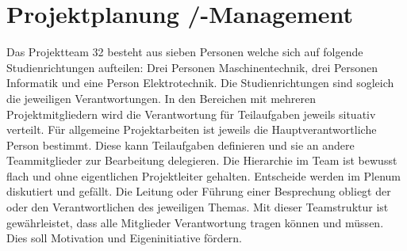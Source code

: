 \section{Projektplanung /-Management}
	Das Projektteam 32 besteht aus sieben Personen welche sich auf folgende Studienrichtungen aufteilen: Drei Personen Maschinentechnik, drei Personen Informatik und eine Person Elektrotechnik. Die Studienrichtungen sind sogleich die jeweiligen Verantwortungen. In den Bereichen mit mehreren Projektmitgliedern wird die Verantwortung  für Teilaufgaben jeweils situativ verteilt. Für allgemeine Projektarbeiten ist jeweils die Hauptverantwortliche Person bestimmt. Diese kann Teilaufgaben definieren und sie an andere Teammitglieder zur Bearbeitung delegieren. Die Hierarchie im Team ist bewusst flach und ohne eigentlichen Projektleiter gehalten. Entscheide werden im Plenum diskutiert und gefällt. Die Leitung oder Führung einer Besprechung obliegt der oder den Verantwortlichen des jeweiligen Themas. Mit dieser Teamstruktur ist gewährleistet, dass alle Mitglieder Verantwortung tragen können und müssen. Dies soll Motivation und Eigeninitiative fördern.